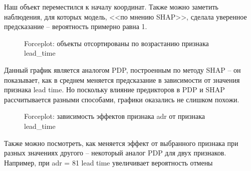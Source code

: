 Наш объект переместился к началу координат. Также можно заметить наблюдения, для которых модель, <<по мнению SHAP>>, сделала уверенное предсказание -- вероятность примерно равна 1.

\vspace{-1mm}
\begin{figure}[h]
	\caption*{Forceplot: объекты отсортированы по возрастанию признака lead\_time}
\end{figure}
\vspace{-4mm}

Данный график является аналогом PDP, построенным по методу SHAP -- он показывает, как в среднем меняется предсказание в зависимости от значения признака lead time. Но поскольку влияние предикторов в PDP и SHAP рассчитывается разными способами, графики оказались не слишком похожи.

\vspace{-1mm}
\begin{figure}[h]
	\caption*{Forceplot: зависимость эффектов признака adr от признака lead\_time}
\end{figure}
\vspace{-4mm}

Также можно посмотреть, как меняется эффект от выбранного признака при разных значениях другого -- некоторый аналог PDP для двух признаков. Например, при adr = 81 lead time увеличивает вероятность отмены

